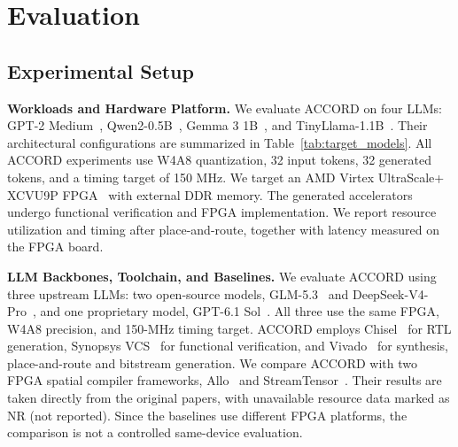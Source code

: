 \documentclass[9pt,conference]{IEEEtran}
\begin{document}
\section{Evaluation}
\subsection{Experimental Setup}
\textbf{Workloads and Hardware Platform.}
We evaluate ACCORD on four LLMs: GPT-2 Medium~\cite{gpt2},
Qwen2-0.5B~\cite{qwen2}, Gemma 3 1B~\cite{gemma3},
and TinyLlama-1.1B~\cite{tinyllama}. Their architectural
configurations are summarized in Table~\ref{tab:target_models}.
All ACCORD experiments use W4A8 quantization, 32 input tokens, 32
generated tokens, and a timing target of 150 MHz. We target
an AMD Virtex UltraScale+ XCVU9P FPGA~\cite{amd_virtex}
with external DDR memory. The generated accelerators
undergo functional verification and FPGA implementation.
We report resource utilization and timing after place-and-route,
together with latency measured on the FPGA board.

\textbf{LLM Backbones, Toolchain, and Baselines.}
We evaluate ACCORD using three upstream LLMs: two
open-source models, GLM-5.3~\cite{glm5.3} and DeepSeek-V4-Pro~\cite{deepseekv4pro}, and
one proprietary model, GPT-6.1 Sol~\cite{gpt6.1sol}. All three use the
same FPGA, W4A8 precision, and 150-MHz timing target.
ACCORD employs Chisel~\cite{chisel} for RTL generation, Synopsys VCS~\cite{vcs}
for functional verification, and Vivado~\cite{vivado} for synthesis, place-and-route and bitstream generation. We compare ACCORD with two FPGA
spatial compiler frameworks, Allo~\cite{allo} and
StreamTensor~\cite{streamtensor}. Their results are taken
directly from the original papers, with unavailable
resource data marked as NR (not reported). Since the
baselines use different FPGA platforms, the comparison
is not a controlled same-device evaluation.
\end{document}
